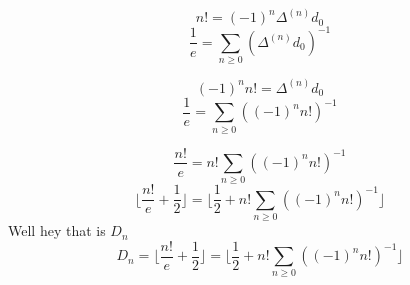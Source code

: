 \documentclass[10pt, AMS Euler]{article}
\begin{document}
\begin{enumerate}
        $$ n! = (-1)^n \Delta^{(n)} d_0 $$
        $$ \frac{1}{e} = \sum_{n \geq 0} (\Delta^{(n)}d_0)^{-1} $$

        $$ (-1)^n n! = \Delta^{(n)} d_0 $$
        $$ \frac{1}{e} = \sum_{n \geq 0} ((-1)^n n!)^{-1} $$

        $$ \frac{n!}{e} = n! \sum_{n \geq 0} ((-1)^n n!)^{-1} $$
        $$ \lfloor \frac{n!}{e} + \frac{1}{2} \rfloor = \lfloor \frac{1}{2}  + n! \sum_{n \geq 0} ((-1)^n n!)^{-1} \rfloor $$
        Well hey that is $D_n$ \\
        $$ D_n = \lfloor \frac{n!}{e} + \frac{1}{2} \rfloor = \lfloor \frac{1}{2}  + n! \sum_{n \geq 0} ((-1)^n n!)^{-1} \rfloor $$
        




  
	\end{enumerate}
\end{document}
